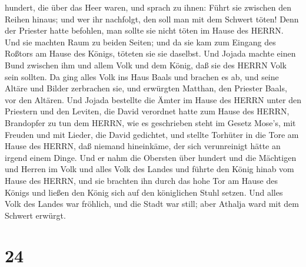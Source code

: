 hundert, die über das Heer waren, und sprach zu ihnen: Führt sie
zwischen den Reihen hinaus; und wer ihr nachfolgt, den soll man mit dem
Schwert töten! Denn der Priester hatte befohlen, man sollte sie nicht
töten im Hause des HERRN.  Und sie machten Raum zu beiden
Seiten; und da sie kam zum Eingang des Roßtors am Hause des Königs,
töteten sie sie daselbst.  Und Jojada machte einen Bund
zwischen ihm und allem Volk und dem König, daß sie des HERRN Volk sein
sollten.  Da ging alles Volk ins Haus Baals und brachen es
ab, und seine Altäre und Bilder zerbrachen sie, und erwürgten Matthan,
den Priester Baals, vor den Altären.  Und Jojada bestellte
die Ämter im Hause des HERRN unter den Priestern und den Leviten, die
David verordnet hatte zum Hause des HERRN, Brandopfer zu tun dem HERRN,
wie es geschrieben steht im Gesetz Mose's, mit Freuden und mit Lieder,
die David gedichtet,  und stellte Torhüter in die Tore am
Hause des HERRN, daß niemand hineinkäme, der sich verunreinigt hätte an
irgend einem Dinge.  Und er nahm die Obersten über hundert
und die Mächtigen und Herren im Volk und alles Volk des Landes und
führte den König hinab vom Hause des HERRN, und sie brachten ihn durch
das hohe Tor am Hause des Königs und ließen den König sich auf den
königlichen Stuhl setzen.  Und alles Volk des Landes war
fröhlich, und die Stadt war still; aber Athalja ward mit dem Schwert
erwürgt.

\hypertarget{section-23}{%
\section{24}\label{section-23}}

